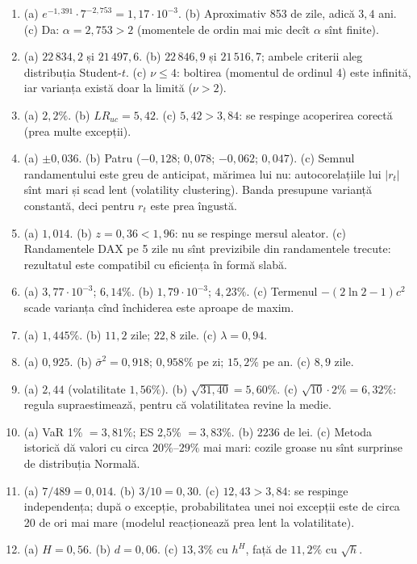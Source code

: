 \documentclass[10.5pt]{article}
\begin{document}
{\begin{enumerate}[label=\textbf{\arabic*.},leftmargin=2.2em,itemsep=0.25ex]
are varianță mare; pentru $k$ mare intră în calcul observații din centrul distribuției și apare deplasarea.
\item (a) $e^{-1{,}391}\cdot 7^{-2{,}753}=1{,}17\cdot 10^{-3}$. (b) Aproximativ 853 de zile, adică $3{,}4$ ani.
(c) Da: $\alpha=2{,}753>2$ (momentele de ordin mai mic decît $\alpha$ sînt finite).
\item (a) $22\,834{,}2$ și $21\,497{,}6$. (b) $22\,846{,}9$ și $21\,516{,}7$; ambele criterii aleg distribuția
Student-$t$. (c) $\nu\le 4$: boltirea (momentul de ordinul 4) este infinită, iar varianța există doar la limită
($\nu>2$).
\item (a) $2{,}2\%$. (b) $LR_{uc}=5{,}42$. (c) $5{,}42>3{,}84$: se respinge acoperirea corectă (prea multe excepții).
\item (a) $\pm 0{,}036$. (b) Patru ($-0{,}128$; $0{,}078$; $-0{,}062$; $0{,}047$). (c) Semnul randamentului este greu de
anticipat, mărimea lui nu: autocorelațiile lui $|r_t|$ sînt mari și scad lent (volatility clustering). Banda
presupune varianță constantă, deci pentru $r_t$ este prea îngustă.
\item (a) $1{,}014$. (b) $z=0{,}36<1{,}96$: nu se respinge mersul aleator. (c) Randamentele DAX pe 5 zile nu sînt
previzibile din randamentele trecute: rezultatul este compatibil cu eficiența în formă slabă.
\item (a) $3{,}77\cdot 10^{-3}$; $6{,}14\%$. (b) $1{,}79\cdot 10^{-3}$; $4{,}23\%$. (c) Termenul $-(2\ln 2-1)c^2$ scade
varianța cînd închiderea este aproape de maxim.
\item (a) $1{,}445\%$. (b) $11{,}2$ zile; $22{,}8$ zile. (c) $\lambda=0{,}94$.
\item (a) $0{,}925$. (b) $\bar\sigma^2=0{,}918$; $0{,}958\%$ pe zi; $15{,}2\%$ pe an. (c) $8{,}9$ zile.
\item (a) $2{,}44$ (volatilitate $1{,}56\%$). (b) $\sqrt{31{,}40}=5{,}60\%$. (c) $\sqrt{10}\cdot 2\%=6{,}32\%$:
regula supraestimează, pentru că volatilitatea revine la medie.
\item (a) VaR 1\% $=3{,}81\%$; ES 2,5\% $=3{,}83\%$. (b) $2236$ de lei. (c) Metoda istorică dă valori cu circa
$20\%$--$29\%$ mai mari: cozile groase nu sînt surprinse de distribuția Normală.
\item (a) $7/489=0{,}014$. (b) $3/10=0{,}30$. (c) $12{,}43>3{,}84$: se respinge independența; după o excepție,
probabilitatea unei noi excepții este de circa 20 de ori mai mare (modelul reacționează prea lent la volatilitate).
\item (a) $H=0{,}56$. (b) $d=0{,}06$. (c) $13{,}3\%$ cu $h^H$, față de $11{,}2\%$ cu $\sqrt h$.

\end{enumerate}}
\end{document}
